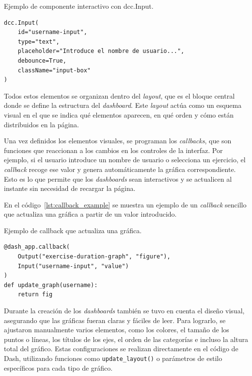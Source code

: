 \documentclass[a4paper, 12pt]{book}
\begin{document}
\begin{listing}[h!]
\caption{Ejemplo de componente interactivo con dcc.Input.}
\label{lst:dcc_input_example}
\begin{verbatim}
dcc.Input(
    id="username-input",
    type="text",
    placeholder="Introduce el nombre de usuario...",
    debounce=True,
    className="input-box"
)
\end{verbatim}
\end{listing}

Todos estos elementos se organizan dentro del \textit{layout}, que es el bloque central donde se define la estructura del \textit{dashboard}. Este \textit{layout} actúa como un esquema visual en el que se indica qué elementos aparecen, en qué orden y cómo están distribuidos en la página.

Una vez definidos los elementos visuales, se programan los \textit{callbacks}, que son funciones que reaccionan a los cambios en los controles de la interfaz. Por ejemplo, si el usuario introduce un nombre de usuario o selecciona un ejercicio, el \textit{callback} recoge ese valor y genera automáticamente la gráfica correspondiente. Esto es lo que permite que los \textit{dashboards} sean interactivos y se actualicen al instante sin necesidad de recargar la página.

En el código~\ref{lst:callback_example} se muestra un ejemplo de un \textit{callback} sencillo que actualiza una gráfica a partir de un valor introducido.

\begin{listing}[h!]
\caption{Ejemplo de callback que actualiza una gráfica.}
\label{lst:callback_example}
\begin{verbatim}
@dash_app.callback(
    Output("exercise-duration-graph", "figure"),
    Input("username-input", "value")
)
def update_graph(username):
    return fig
\end{verbatim}
\end{listing}

Durante la creación de los \textit{dashboards} también se tuvo en cuenta el diseño visual, asegurando que las gráficas fueran claras y fáciles de leer. Para lograrlo, se ajustaron manualmente varios elementos, como los colores, el tamaño de los puntos o líneas, los títulos de los ejes, el orden de las categorías e incluso la altura total del gráfico. Estas configuraciones se realizan directamente en el código de Dash, utilizando funciones como \texttt{update\_layout()} o parámetros de estilo específicos para cada tipo de gráfico.
\end{document}
